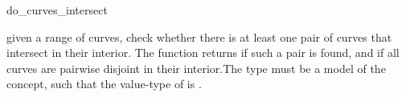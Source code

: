 \ccRefPageBegin

\begin{ccRefFunction}{do_curves_intersect}


{given a range of curves, check whether there is at least one pair of curves
 that intersect in their interior. The function returns  if such
 a pair is found, and  if all curves are pairwise disjoint in
 their interior.The  type must be a model
 of the  concept, such that the value-type of
  is .}

\end{ccRefFunction}

\ccRefPageEnd


